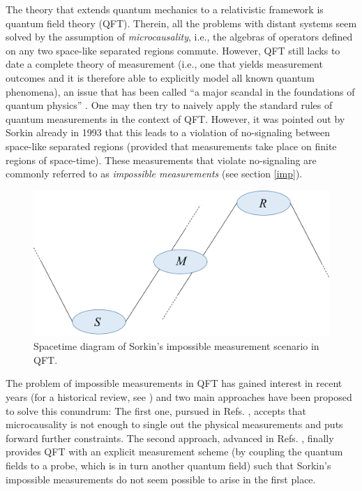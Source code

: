 \documentclass[a4paper,twocolumn,11pt,accepted=2024-02-14]{quantumarticle}
\begin{document}
The theory that extends quantum mechanics to a relativistic framework is quantum field theory (QFT). Therein, all the problems with distant systems seem solved by the assumption of \textit{microcausality}, i.e., the algebras of operators defined on any two space-like separated regions commute. However, QFT still lacks to date a complete theory of measurement (i.e., one that yields measurement outcomes and it is therefore able to explicitly model all known quantum phenomena), an issue that has been called “a major scandal in the foundations of quantum physics” \cite{earman}. One may then try to naively apply the  standard rules of quantum measurements in the context of QFT. However, it was pointed out by Sorkin  already in 1993 \cite{sorkin1993impossible} that this leads to a violation of no-signaling between space-like separated regions (provided that measurements take place on finite regions of space-time). These measurements that violate no-signaling are commonly referred to as \textit{impossible measurements} (see section \ref{imp}). 
\begin{figure}[ht]
    \centering
    \includegraphics[width=.48\textwidth]{sorkin.png}
    \caption{Spacetime diagram of Sorkin's impossible measurement scenario in QFT.}
    \label{fig1}
\end{figure}

The problem of impossible measurements in QFT has gained interest in recent years (for a historical review, see \cite{fraser2023note, papageorgiou2023eliminating}) and two main approaches have been proposed to solve this conundrum: The first one, pursued in Refs. \cite{borsten2021impossible, jubb2022causal, albertini2023ideal}, accepts that microcausality is not enough to single out the physical measurements and puts forward further constraints. The second approach, advanced in Refs. \cite{fewster2020quantum, fewster2020generally, bostelmann2021impossible, fewster2023measurement}, finally provides  QFT with an explicit measurement scheme (by coupling the quantum fields to a probe, which is in turn another quantum field) such that Sorkin's impossible measurements do not seem possible to arise in the first place. 
\end{document}
